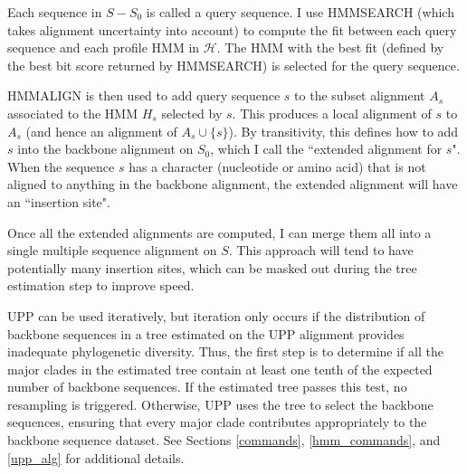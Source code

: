 Each sequence in $S-S_0$ is called a query sequence.
I use HMMSEARCH (which takes alignment
uncertainty into account)
to compute the fit between each
query sequence and each profile HMM in $\mathcal{H}$.
The HMM with the best fit (defined by the
best bit score returned by HMMSEARCH) is
selected for the query sequence.

HMMALIGN is then used to add  
query sequence $s$ to the
subset alignment $A_s$
associated to the HMM $H_s$ selected by $s$.
This produces a local alignment of $s$ to $A_s$ 
(and hence an alignment of $A_s \cup \{s\}$). 
By transitivity, 
this defines how to add $s$ into the  backbone alignment on $S_0$,
which I call the ``extended alignment for $s$".
When the sequence $s$ has 
a character  (nucleotide or amino acid)
that is not aligned to anything in the backbone
alignment, the extended alignment will have
an ``insertion site".


Once all the extended alignments are computed, I can merge
them all into a single multiple sequence alignment on $S$.
This approach will tend to have potentially many insertion sites,
which  can be 
masked out during the tree estimation step to improve
speed.

UPP can be used iteratively,
but iteration only occurs if the distribution of
backbone sequences in a tree estimated on the UPP alignment
provides inadequate phylogenetic diversity.
Thus, the first step is to determine if 
all the major clades in  the estimated tree
contain at least one tenth of the
expected number of backbone sequences.
If the estimated tree passes this test, no resampling is triggered.
Otherwise, UPP uses the tree to select the backbone
sequences, ensuring that every major clade contributes
appropriately to the backbone sequence dataset.
See 
Sections \ref{commands}, \ref{hmm_commands}, and \ref{upp_alg}
for additional details.


